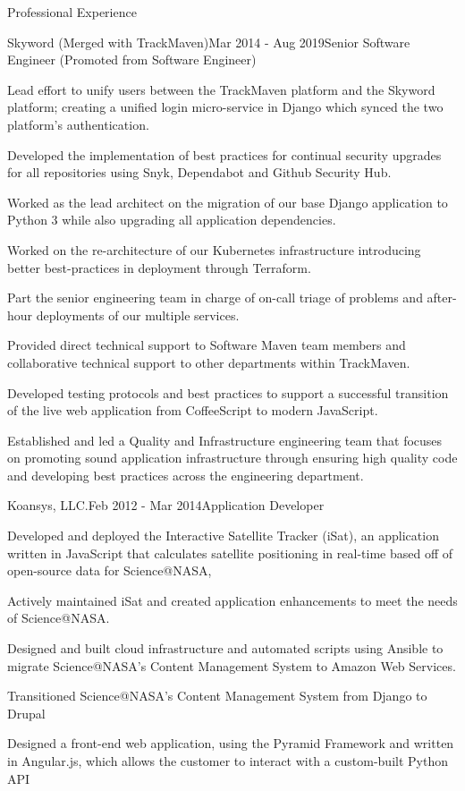 \documentclass{bluefin_cv}
\begin{document}
\begin{bfcvSection}{Professional Experience}
\begin{bfcvWorkSubsection}{Skyword (Merged with TrackMaven)}{Mar 2014 - Aug 2019}{Senior Software Engineer (Promoted from Software Engineer)}
\item Lead effort to unify users between the TrackMaven platform and the Skyword platform; creating a unified login micro-service in Django which synced the two platform's authentication.
\item Developed the implementation of best practices for continual security upgrades for all repositories using Snyk, Dependabot and Github Security Hub.
\item Worked as the lead architect on the migration of our base Django application to Python 3 while also upgrading all application dependencies.
\item Worked on the re-architecture of our Kubernetes infrastructure introducing better best-practices in deployment through Terraform.
\item Part the senior engineering team in charge of on-call triage of problems and after-hour deployments of our multiple services.
\item Provided direct technical support to Software Maven team members and collaborative technical support to other departments within TrackMaven.
\item Developed testing protocols and best practices to support a successful transition of the live web application from CoffeeScript to modern JavaScript.
\item Established and led a Quality and Infrastructure engineering team that focuses on promoting sound application infrastructure through ensuring high quality code and developing best practices across the engineering department.
\end{bfcvWorkSubsection}

\begin{bfcvWorkSubsection}{Koansys, LLC.}{Feb 2012 - Mar 2014}{Application Developer}
\item Developed and deployed the Interactive Satellite Tracker (iSat), an application written in JavaScript that calculates satellite positioning in real-time based off of open-source data for Science@NASA,
\item Actively maintained iSat and created application enhancements to meet the needs of Science@NASA.
\item Designed and built cloud infrastructure and automated scripts using Ansible to migrate Science@NASA’s Content Management System to Amazon Web Services.
\item Transitioned Science@NASA’s Content Management System from Django to Drupal
\item Designed a front-end web application, using the Pyramid Framework and written in Angular.js, which allows the customer to interact with a custom-built Python API
\end{bfcvWorkSubsection}
\end{bfcvSection}
\end{document}
